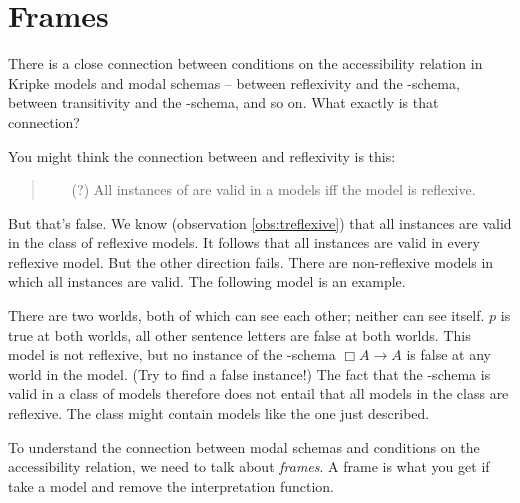 

\section{Frames}\label{sec:frames}

There is a close connection between conditions on the accessibility relation in
Kripke models and modal schemas -- between reflexivity and the -schema,
between transitivity and the -schema, and so on. What exactly is that
connection?

You might think the connection between  and reflexivity is this:
\begin{quote}
  \begin{itemize}
    \item[(?)] All instances of  are valid in a models iff the model is reflexive.
  \end{itemize}
\end{quote}
%
But that's false. We know (observation \ref{obs:treflexive}) that all 
instances are valid in the class of reflexive models. It follows that all 
instances are valid in every reflexive model. But the other direction fails.
There are non-reflexive models in which all  instances are valid. The
following model is an example.
\begin{center}
\end{center}
There are two worlds, both of which can see each other; neither can see itself.
$p$ is true at both worlds, all other sentence letters are false at both worlds.
This model is not reflexive, but no instance of the -schema $\Box A \to A$
is false at any world in the model. (Try to find a false instance!) The fact
that the -schema is valid in a class of models therefore does not entail
that all models in the class are reflexive. The class might contain models like
the one just described.

To understand the connection between modal schemas and conditions on the
accessibility relation, we need to talk about \emph{frames}. A frame is what you
get if take a model and remove the interpretation function.

